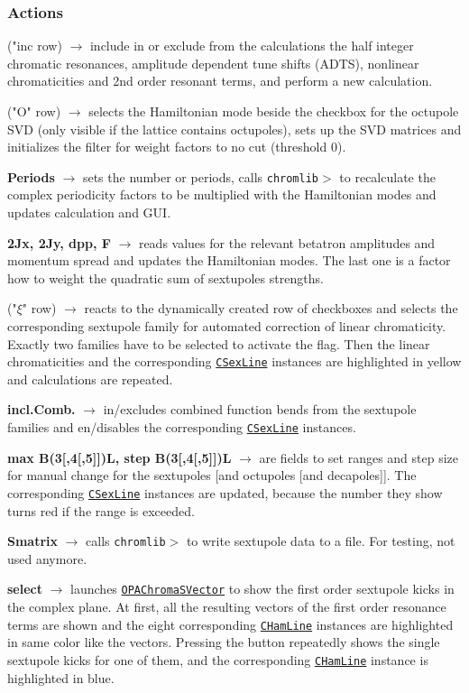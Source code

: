 \documentclass[12pt]{article}
\newcommand\code[1]{{\tt #1}}
\newcommand{\ofld}[1]{\colorbox{black!15}{{\bf #1}}}
\newcommand{\ofldx}[1]{\colorbox{black!15}{(#1)}}
\newcommand\guico[1]{{\color{blue}\code{#1}}}
\newcommand{\unico}[1]{{\color{burntorange}\code{#1}}}
\newcommand{\evcod}[2]{\ofld{#1} $\rightarrow$ \guico{#2}}
\newcommand{\evcodx}[2]{\ofldx{#1} $\rightarrow$ \guico{#2}}
\newcommand{\prcod}[2]{\opauni{#1}$>$\unico{#2}}
\newcommand{\opagui}[1]{\colorbox{blue!20}{\code{#1}}}
\newcommand{\ogui}[1]{\hyperref[#1]{\opagui{#1}}}
\newcommand{\opaguif}[1]{\colorbox{violet!30}{\code{#1}}}
\newcommand{\oguif}[1]{\hyperref[#1]{\opaguif{#1}}}
\newcommand{\opauni}[1]{\colorbox{orange!30}{\code{#1}}}
\newcommand{\act}[1]{\subsubsection*{Actions} #1}
\newcommand{\todo}[1]{{\color{red} #1}}
\begin{document}
\act{
\evcodx{"inc row}{Check(2Q,Qxx,Cr2,Oct)Click} include in or exclude from the calculations the half integer chromatic resonances, amplitude dependent tune shifts (ADTS), nonlinear chromaticities and 2nd order resonant terms, and perform a new calculation.

\evcodx{"O" row}{CheckOctClick} selects the Hamiltonian mode beside the checkbox for the octupole SVD (only visible if the lattice contains octupoles), sets up the SVD matrices and initializes the filter for weight factors to no cut (threshold 0).

\evcod{Periods}{edPer(KeyPress,Exit)} sets the number or periods, calls \prcod{chromlib}{S\_Period} to recalculate the complex periodicity factors to be multiplied with the Hamiltonian modes and updates calculation and GUI.

\evcod{2Jx, 2Jy, dpp, F}{EdScPar(KeyPress,Exit)} reads values for the relevant betatron amplitudes and momentum spread and updates the Hamiltonian modes. The last one is a factor how to weight the quadratic sum of sextupoles strengths.

\evcodx{"$\xi$" row}{CSelectClick} reacts to the dynamically created row of checkboxes and selects the corresponding sextupole family for automated correction of linear chromaticity. Exactly two families have to be selected to activate the \guico{AutoChrom} flag. Then the linear chromaticities and the corresponding \oguif{CSexLine} instances are highlighted in yellow and calculations are repeated.

\evcod{incl.Comb.}{ChkCombClick} in/excludes combined function bends from the sextupole families and en/disables the corresponding \oguif{CSexLine} instances.

\evcod{max B(3[,4[,5]])L, step B(3[,4[,5]])L}{edSOD(KeyPress,Exit)} are fields to set ranges and step size for manual change for the sextupoles [and octupoles [and decapoles]]. The corresponding \oguif{CSexLine} instances are updated, because the number they show turns red if the range is exceeded.

\evcod{Smatrix}{butSmatClick} calls \prcod{chromlib}{S\_TestOut} to write sextupole data to a file. \todo{For testing, not used anymore}.

\evcod{select}{butSelectClick} launches \ogui{OPAChromaSVector} to show the first order sextupole kicks in the complex plane. At first, all the resulting vectors of the first order resonance terms are shown and the eight corresponding  \oguif{CHamLine} instances are highlighted in same color like the vectors. Pressing the button repeatedly shows the single sextupole kicks for one of them, and the corresponding \oguif{CHamLine} instance is highlighted in blue.

}
\end{document}
